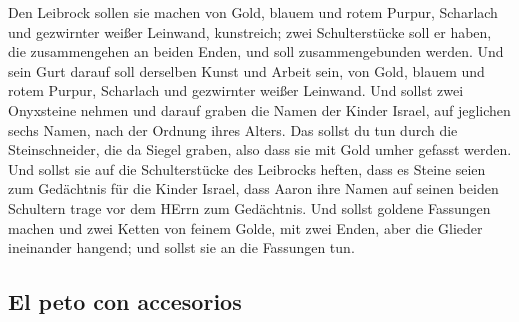  Den Leibrock sollen sie machen von Gold, blauem und rotem
Purpur, Scharlach und gezwirnter weißer Leinwand, kunstreich;
 zwei Schulterstücke soll er haben, die zusammengehen an
beiden Enden, und soll zusammengebunden werden.  Und sein
Gurt darauf soll derselben Kunst und Arbeit sein, von Gold, blauem und
rotem Purpur, Scharlach und gezwirnter weißer Leinwand. 
Und sollst zwei Onyxsteine nehmen und darauf graben die Namen der Kinder
Israel,  auf jeglichen sechs Namen, nach der Ordnung
ihres Alters.  Das sollst du tun durch die
Steinschneider, die da Siegel graben, also dass sie mit Gold umher
gefasst werden.  Und sollst sie auf die Schulterstücke
des Leibrocks heften, dass es Steine seien zum Gedächtnis für die Kinder
Israel, dass Aaron ihre Namen auf seinen beiden Schultern trage vor dem
HErrn zum Gedächtnis.  Und sollst goldene Fassungen
machen  und zwei Ketten von feinem Golde, mit zwei Enden,
aber die Glieder ineinander hangend; und sollst sie an die Fassungen
tun.

\hypertarget{el-peto-con-accesorios}{%
\subsection{El peto con accesorios}\label{el-peto-con-accesorios}}

